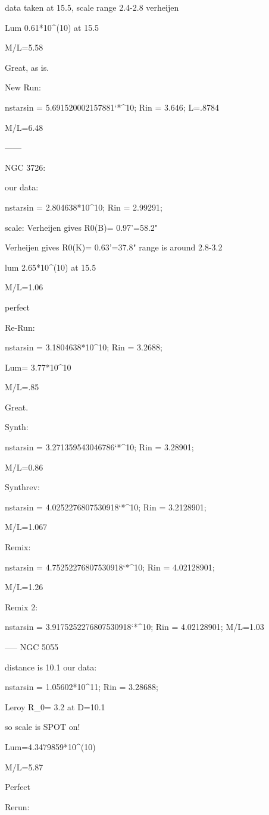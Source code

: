 data taken at 15.5, scale range 2.4-2.8 verheijen

Lum 0.61*10^(10) at 15.5

M/L=5.58

Great, as is.


New Run:

nstarsin = 5.691520002157881`*^10;
Rin = 3.646;
L=.8784

M/L=6.48

------

NGC 3726:

our data:

nstarsin = 2.804638*10^10;
Rin = 2.99291;

scale:
Verheijen gives R0(B)= 0.97'=58.2" 

Verheijen gives R0(K)= 0.63'=37.8" range is around 2.8-3.2

lum  2.65*10^(10) at 15.5

M/L=1.06

perfect

Re-Run:

nstarsin = 3.1804638*10^10;
Rin = 3.2688;

Lum= 3.77*10^10


M/L=.85

Great.

Synth:

nstarsin = 3.271359543046786`*^10;
Rin = 3.28901;

M/L=0.86

Synthrev:

nstarsin = 4.0252276807530918`*^10;
Rin = 3.2128901;

M/L=1.067

Remix: 

nstarsin = 4.75252276807530918`*^10;
Rin = 4.02128901;

M/L=1.26

Remix 2:

nstarsin = 3.9175252276807530918`*^10;
Rin = 4.02128901;
M/L=1.03

-----
NGC 5055

distance is 10.1
our data:

nstarsin = 1.05602*10^11;
Rin = 3.28688;

Leroy R_0= 3.2 at D=10.1

so scale is SPOT on!

Lum=4.3479859*10^(10)

M/L=5.87

Perfect


Rerun:


